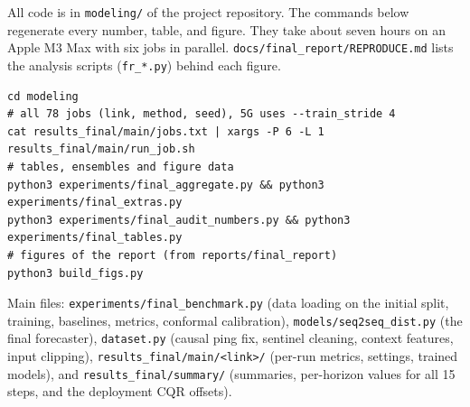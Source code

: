 All code is in \texttt{modeling/} of the project repository. The commands below regenerate every number, table, and figure. They take about seven hours on an Apple M3 Max with six jobs in parallel. \texttt{docs/final\_report/REPRODUCE.md} lists the analysis scripts (\texttt{fr\_*.py}) behind each figure.

\begin{small}
\begin{verbatim}
cd modeling
# all 78 jobs (link, method, seed), 5G uses --train_stride 4
cat results_final/main/jobs.txt | xargs -P 6 -L 1 results_final/main/run_job.sh
# tables, ensembles and figure data
python3 experiments/final_aggregate.py && python3 experiments/final_extras.py
python3 experiments/final_audit_numbers.py && python3 experiments/final_tables.py
# figures of the report (from reports/final_report)
python3 build_figs.py
\end{verbatim}
\end{small}

\noindent Main files: \texttt{experiments/final\_benchmark.py} (data loading on the initial split, training, baselines, metrics, conformal calibration), \texttt{models/seq2seq\_dist.py} (the final forecaster), \texttt{dataset.py} (causal ping fix, sentinel cleaning, context features, input clipping), \texttt{results\_final/main/<link>/} (per-run metrics, settings, trained models), and \texttt{results\_final/summary/} (summaries, per-horizon values for all 15 steps, and the deployment CQR offsets).
